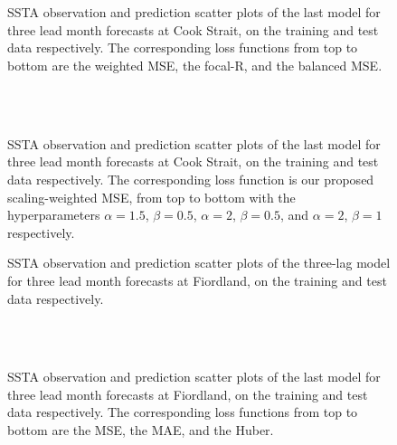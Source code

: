 \documentclass[11pt, a4paper]{article}
\begin{document}
\begin{figure}[H]
\centering
{}
\\
\\
\caption{SSTA observation and prediction scatter plots of the last model for three lead month forecasts at Cook Strait, on the training and test data respectively. The corresponding loss functions from top to bottom are the weighted MSE, the focal-R, and the balanced MSE.}
\end{figure}

\begin{figure}[H]
\centering
{}
\\
\\
\caption{SSTA observation and prediction scatter plots of the last model for three lead month forecasts at Cook Strait, on the training and test data respectively. The corresponding loss function is our proposed scaling-weighted MSE, from top to bottom with the hyperparameters $\alpha=1.5$, $\beta=0.5$, $\alpha=2$, $\beta=0.5$, and $\alpha=2$, $\beta=1$ respectively.}
\end{figure}

\begin{figure}[H]
\centering
{}
\caption{SSTA observation and prediction scatter plots of the three-lag model for three lead month forecasts at Fiordland, on the training and test data respectively.}
\end{figure}

\begin{figure}[H]
\centering
{}
\\
\\
\caption{SSTA observation and prediction scatter plots of the last model for three lead month forecasts at Fiordland, on the training and test data respectively. The corresponding loss functions from top to bottom are the MSE, the MAE, and the Huber.}
\end{figure}
\end{document}
